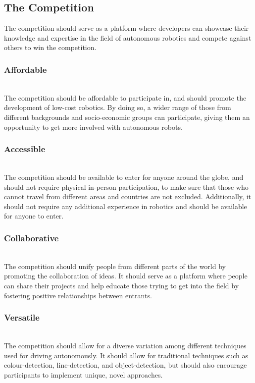 \documentclass{l4proj}
\begin{document}
\subsection{The Competition}\label{sec:comp-aims}
The competition should serve as a platform where developers can showcase their knowledge and expertise in the field of autonomous robotics and compete against others to win the competition. 
\\
\subsubsection{Affordable} \hfill \\
The competition should be affordable to participate in, and should promote the development of low-cost robotics. By doing so, a wider range of those from different backgrounds and socio-economic groups can participate, giving them an opportunity to get more involved with autonomous robots.

\subsubsection{Accessible} \hfill \\
The competition should be available to enter for anyone around the globe, and should not require physical in-person participation, to make sure that those who cannot travel from different areas and countries are not excluded. Additionally, it should not require any additional experience in robotics and should be available for anyone to enter.

\subsubsection{Collaborative} \hfill \\
The competition should unify people from different parts of the world by promoting the collaboration of ideas. It should serve as a platform where people can share their projects and help educate those trying to get into the field by fostering positive relationships between entrants. 

\subsubsection{Versatile} \hfill \\
The competition should allow for a diverse variation among different techniques used for driving autonomously. It should allow for traditional techniques such as colour-detection, line-detection, and object-detection, but should also encourage participants to implement unique, novel approaches.
\end{document}
